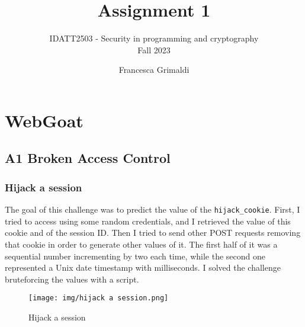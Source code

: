 \documentclass{article}
\title{%
    \huge Assignment 1}
\subtitle{%
    IDATT2503 - Security in programming and cryptography\\
    Fall 2023
    }
\author{%
  Francesca Grimaldi
}
\date{}
\begin{document}
\maketitle





\section{WebGoat}
\subsection{A1 Broken Access Control}
\subsubsection{Hijack a session}
The goal of this challenge was to predict the value of the \texttt{hijack\_cookie}.
First, I tried to access using some random credentials, and I retrieved the value of this cookie and of the session ID.
Then I tried to send other POST requests removing that cookie in order to generate other values of it.
The first half of it was a sequential number incrementing by two each time, while the second one represented a Unix date timestamp with milliseconds.
I solved the challenge bruteforcing the values with a script.
\begin{figure}[H]
    \centering
    \texttt{[image: img/hijack a session.png]}
    \caption{Hijack a session}
    \label{fig:hijack_a_session}
\end{figure}
\end{document}
